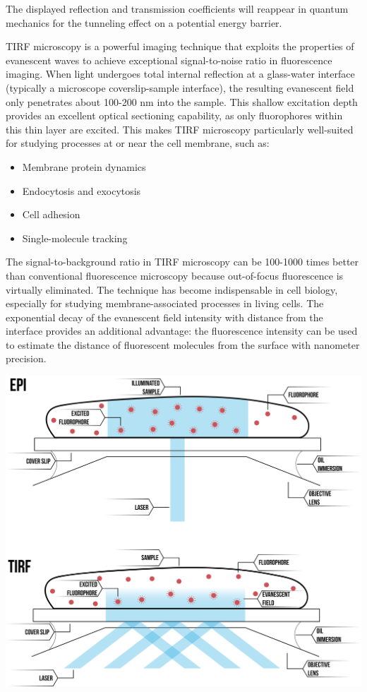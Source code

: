 \documentclass[
  a4paper,
]{book}
\providecommand{\tightlist}{%
  \setlength{\itemsep}{0pt}\setlength{\parskip}{0pt}}
\begin{document}
The displayed reflection and transmission coefficients will reappear in
quantum mechanics for the tunneling effect on a potential energy
barrier.

\begin{tcolorbox}[enhanced jigsaw, coltitle=black, title=\textcolor{quarto-callout-note-color}{\faInfo}\hspace{0.5em}{Total Internal Reflection Fluorescence (TIRF) Microscopy}, colframe=quarto-callout-note-color-frame, toprule=.15mm, opacitybacktitle=0.6, left=2mm, opacityback=0, breakable, toptitle=1mm, bottomtitle=1mm, leftrule=.75mm, arc=.35mm, titlerule=0mm, colbacktitle=quarto-callout-note-color!10!white, rightrule=.15mm, bottomrule=.15mm, colback=white]

TIRF microscopy is a powerful imaging technique that exploits the
properties of evanescent waves to achieve exceptional signal-to-noise
ratio in fluorescence imaging. When light undergoes total internal
reflection at a glass-water interface (typically a microscope
coverslip-sample interface), the resulting evanescent field only
penetrates about 100-200 nm into the sample. This shallow excitation
depth provides an excellent optical sectioning capability, as only
fluorophores within this thin layer are excited. This makes TIRF
microscopy particularly well-suited for studying processes at or near
the cell membrane, such as:

\begin{itemize}
\tightlist
\item
  Membrane protein dynamics
\item
  Endocytosis and exocytosis
\item
  Cell adhesion
\item
  Single-molecule tracking
\end{itemize}

The signal-to-background ratio in TIRF microscopy can be 100-1000 times
better than conventional fluorescence microscopy because out-of-focus
fluorescence is virtually eliminated. The technique has become
indispensable in cell biology, especially for studying
membrane-associated processes in living cells. The exponential decay of
the evanescent field intensity with distance from the interface provides
an additional advantage: the fluorescence intensity can be used to
estimate the distance of fluorescent molecules from the surface with
nanometer precision.

\includegraphics[width=0.6\linewidth,height=\textheight,keepaspectratio]{electromagnetic-waves/img/tirf-2.png}


\end{tcolorbox}
\end{document}

